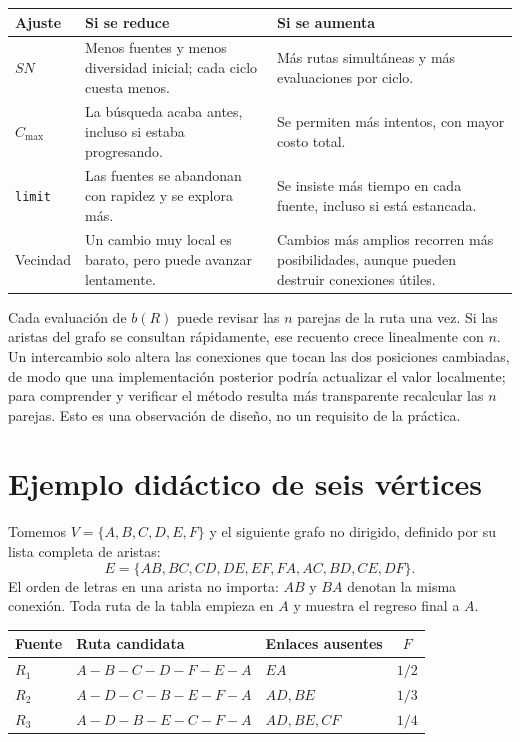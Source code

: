 \begin{center}

\begin{adjustbox}{max width=\linewidth}
\begin{tabular}{p{2.5cm}p{5.0cm}p{5.0cm}}
\toprule
Ajuste & Si se reduce & Si se aumenta\\
\midrule
$SN$ & Menos fuentes y menos diversidad inicial; cada ciclo cuesta menos. & Más rutas simultáneas y más evaluaciones por ciclo.\\
$C_{\max}$ & La búsqueda acaba antes, incluso si estaba progresando. & Se permiten más intentos, con mayor costo total.\\
\texttt{limit} & Las fuentes se abandonan con rapidez y se explora más. & Se insiste más tiempo en cada fuente, incluso si está estancada.\\
Vecindad & Un cambio muy local es barato, pero puede avanzar lentamente. & Cambios más amplios recorren más posibilidades, aunque pueden destruir conexiones útiles.\\
\bottomrule
\end{tabular}
\end{adjustbox}
\end{center}

Cada evaluación de $b(R)$ puede revisar las $n$ parejas de la ruta una vez. Si las aristas del grafo se consultan rápidamente, ese recuento crece linealmente con $n$. Un intercambio solo altera las conexiones que tocan las dos posiciones cambiadas, de modo que una implementación posterior podría actualizar el valor localmente; para comprender y verificar el método resulta más transparente recalcular las $n$ parejas. Esto es una observación de diseño, no un requisito de la práctica.

\section{Ejemplo didáctico de seis vértices}\label{abc:sec:ejemplo}
Tomemos $V=\{A,B,C,D,E,F\}$ y el siguiente grafo no dirigido, definido por su lista completa de aristas:
\[
E=\{AB,BC,CD,DE,EF,FA,AC,BD,CE,DF\}.
\]
El orden de letras en una arista no importa: $AB$ y $BA$ denotan la misma conexión. Toda ruta de la tabla empieza en $A$ y muestra el regreso final a $A$.

\begin{center}

\begin{adjustbox}{max width=\linewidth}
\begin{tabular}{p{1.5cm}p{7.2cm}p{3.3cm}c}
\toprule
Fuente & Ruta candidata & Enlaces ausentes & $F$\\
\midrule
$R_1$ & $A-B-C-D-F-E-A$ & $EA$ & $1/2$\\
$R_2$ & $A-D-C-B-E-F-A$ & $AD,BE$ & $1/3$\\
$R_3$ & $A-D-B-E-C-F-A$ & $AD,BE,CF$ & $1/4$\\
\bottomrule
\end{tabular}
\end{adjustbox}
\end{center}

